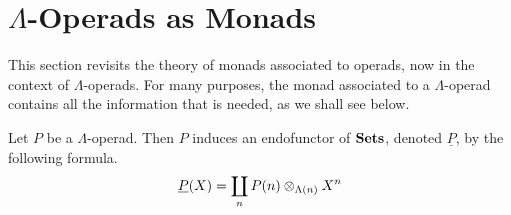 %
%
%
%
%

\begin{rem}\label{rem:sec8-in-V}
\end{rem}





\section{\texorpdfstring{$\Lambda$}{L}-Operads as Monads}

This section revisits the theory of monads associated to operads, now in the context of $\Lambda$-operads.
For many purposes, the monad associated to a $\Lambda$-operad contains all the information that is needed, as we shall see below.

\begin{Defi}\label{Defi:und-P}
Let $P$ be a $\Lambda$-operad. Then $P$ induces an endofunctor of $\mathbf{Sets}$, denoted $\underline{P}$, by the following formula.
  \[
	 \underline{P}(X) = \coprod_n P(n) \otimes_{\Lambda(n)} X^{n}
  \]
\end{Defi}

